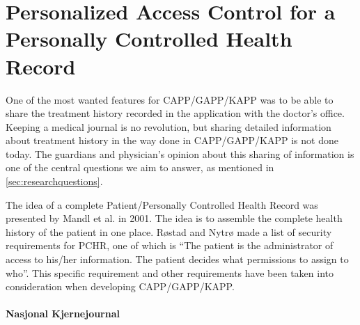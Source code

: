 \section{Personalized Access Control for a Personally Controlled Health Record}
\label{personalhealthrecords}

One of the most wanted features for CAPP/GAPP/KAPP was to be able to share the treatment history recorded in the application with the doctor's office. Keeping a medical journal is no revolution, but sharing detailed information about treatment history in the way done in CAPP/GAPP/KAPP is not done today. The guardians and physician's opinion about this sharing of information is one of the central questions we aim to answer, as mentioned in \ref{sec:researchquestions}.

The idea of a complete Patient/Personally Controlled Health Record was presented by Mandl et al.\cite{mandl2007indivo} in 2001. The idea is to assemble the complete health history of the patient in one place. R\o stad and Nytr\o \cite{rostad2008personalized} made a list of security requirements for PCHR, one of which is ``The patient is the administrator of access to his/her information. The patient decides what permissions to assign to who''. This specific requirement and other requirements\cite{rostad2008personalized} have been taken into consideration when developing CAPP/GAPP/KAPP. 



\paragraph{Nasjonal Kjernejournal}
